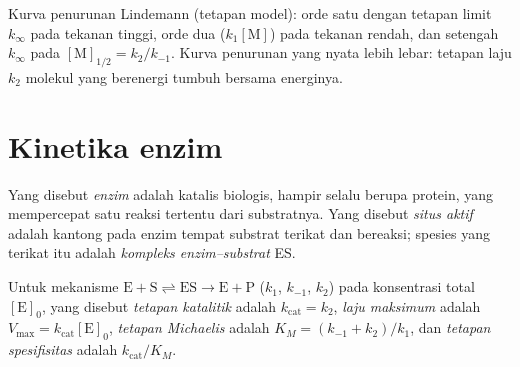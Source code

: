 \begin{omfigure}

{\small Kurva penurunan Lindemann (tetapan model): orde satu dengan tetapan
limit $k_\infty$ pada tekanan tinggi, orde dua ($k_1[\mathrm M]$) pada tekanan
rendah, dan setengah $k_\infty$ pada $[\mathrm M]_{1/2} = k_2/k_{-1}$. Kurva
penurunan yang nyata lebih lebar: tetapan laju $k_2$ molekul yang berenergi
tumbuh bersama energinya.}
\end{omfigure}

\section{Kinetika enzim}

\begin{definition}\label{def:b3:complex-kinetics:enzyme}
Yang disebut \emph{enzim} adalah katalis biologis, hampir selalu
berupa protein, yang mempercepat satu reaksi tertentu dari substratnya. Yang
disebut \emph{situs aktif} adalah kantong pada enzim tempat
substrat terikat dan bereaksi; spesies yang terikat itu adalah
\emph{kompleks enzim--substrat} ES.
\end{definition}

\begin{definition}\label{def:b3:complex-kinetics:michaelis}
Untuk mekanisme $\mathrm{E + S \rightleftharpoons ES \to E + P}$ ($k_1$, $k_{-1}$, $k_2$)
pada konsentrasi  total $[\mathrm E]_0$, yang disebut \emph{tetapan
katalitik} adalah $k_{\mathrm{cat}} = k_2$, \emph{laju
maksimum} adalah $V_{\max} = k_{\mathrm{cat}}[\mathrm E]_0$, \emph{tetapan
Michaelis} adalah $K_M = (k_{-1} + k_2)/k_1$, dan
\emph{tetapan spesifisitas} adalah $k_{\mathrm{cat}}/K_M$.
\end{definition}


